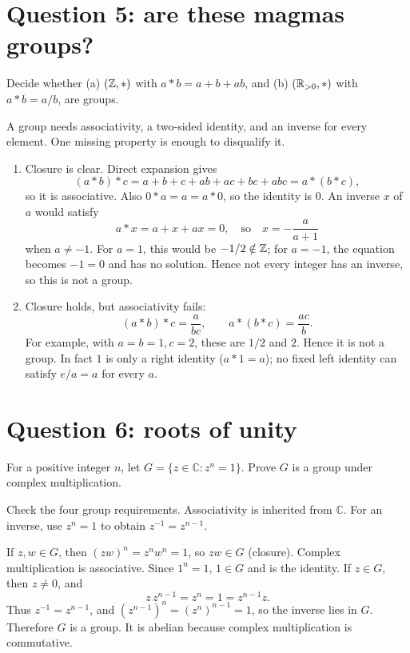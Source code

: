 \documentclass[11pt,openany]{book}
\newcommand{\C}{\mathbb C}\newcommand{\PP}{\mathcal P}
\begin{document}
\section{Question 5: are these magmas groups?}
\begin{questionbox}
Decide whether (a) $(\mathbb Z,*)$ with $a*b=a+b+ab$, and (b) $(\mathbb R_{>0},*)$ with $a*b=a/b$, are groups.
\end{questionbox}
\begin{approachbox}
A group needs associativity, a two-sided identity, and an inverse for every element. One missing property is enough to disqualify it.
\end{approachbox}
\begin{solutionbox}
\begin{enumerate}[label=(\alph*)]
\item Closure is clear. Direct expansion gives
\[
(a*b)*c=a+b+c+ab+ac+bc+abc=a*(b*c),
\]
so it is associative. Also $0*a=a=a*0$, so the identity is $0$. An inverse $x$ of $a$ would satisfy
\[
a*x=a+x+ax=0,
\quad\text{so}\quad x=-\frac a{a+1}
\]
when $a\ne-1$. For $a=1$, this would be $-1/2\notin\mathbb Z$; for $a=-1$, the equation becomes $-1=0$ and has no solution. Hence not every integer has an inverse, so this is not a group.

\item Closure holds, but associativity fails:
\[
(a*b)*c=\frac{a}{bc},
\qquad
a*(b*c)=\frac{ac}{b}.
\]
For example, with $a=b=1,c=2$, these are $1/2$ and $2$. Hence it is not a group. In fact $1$ is only a right identity ($a*1=a$); no fixed left identity can satisfy $e/a=a$ for every $a$.
\end{enumerate}
\end{solutionbox}

\section{Question 6: roots of unity}
\begin{questionbox}
For a positive integer $n$, let $G=\{z\in\C:z^n=1\}$. Prove $G$ is a group under complex multiplication.
\end{questionbox}
\begin{approachbox}
Check the four group requirements. Associativity is inherited from $\C$. For an inverse, use $z^n=1$ to obtain $z^{-1}=z^{n-1}$.
\end{approachbox}
\begin{solutionbox}
If $z,w\in G$, then $(zw)^n=z^nw^n=1$, so $zw\in G$ (closure). Complex multiplication is associative. Since $1^n=1$, $1\in G$ and is the identity. If $z\in G$, then $z\ne0$, and
\[
z\,z^{n-1}=z^n=1=z^{n-1}z.
\]
Thus $z^{-1}=z^{n-1}$, and $(z^{n-1})^n=(z^n)^{n-1}=1$, so the inverse lies in $G$. Therefore $G$ is a group. It is abelian because complex multiplication is commutative.
\end{solutionbox}
\end{document}
